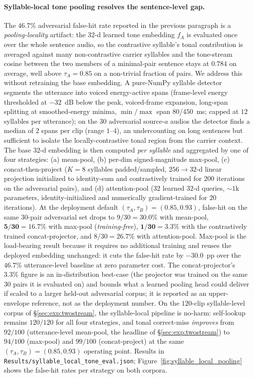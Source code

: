 \documentclass[a4paper,fleqn]{cas-dc}
\begin{document}
\paragraph{Syllable-local tone pooling resolves the sentence-level gap.} The $46.7\%$ adversarial false-hit rate reported in the previous paragraph is a \emph{pooling-locality} artifact: the $32$-d learned tone embedding $f_A$ is evaluated once over the whole sentence audio, so the contrastive syllable's tonal contribution is averaged against many non-contrastive carrier syllables and the tone-stream cosine between the two members of a minimal-pair sentence stays at $0.784$ on average, well above $\tau_A=0.85$ on a non-trivial fraction of pairs. We address this without retraining the base embedding. A pure-NumPy syllable detector segments the utterance into voiced energy-active spans (frame-level energy thresholded at $-32$~dB below the peak, voiced-frame expansion, long-span splitting at smoothed-energy minima, $\min/\max$ span $80$/$450$~ms; capped at $12$ syllables per utterance); on the $30$ adversarial source-$a$ audios the detector finds a median of $2$ spans per clip (range $1$--$4$), an undercounting on long sentences but sufficient to isolate the locally-contrastive tonal region from the carrier context. The base $32$-d embedding is then computed \emph{per syllable} and aggregated by one of four strategies: (a) mean-pool, (b) per-dim signed-magnitude max-pool, (c) concat-then-project ($K{=}8$ syllables padded/sampled, $256\to 32$-d linear projection initialized to identity-sum and contrastively trained for $200$ iterations on the adversarial pairs), and (d) attention-pool ($32$ learned $32$-d queries, $\sim 1$k parameters, identity-initialized and numerically gradient-trained for $20$ iterations). At the deployment default $(\tau_A, \tau_B) = (0.85, 0.93)$, false-hit on the same $30$-pair adversarial set drops to $9/30 = \mathbf{30.0\%}$ with mean-pool, $\mathbf{5/30 = 16.7\%}$ with max-pool (\emph{training-free}), $\mathbf{1/30 = 3.3\%}$ with the contrastively trained concat-projector, and $8/30 = 26.7\%$ with attention-pool. Max-pool is the load-bearing result because it requires no additional training and reuses the deployed embedding unchanged: it cuts the false-hit rate by $\mathbf{-30.0}$~pp over the $46.7\%$ utterance-level baseline at zero parameter cost. The concat-projector's $3.3\%$ figure is an in-distribution best-case (the projector was trained on the same $30$ pairs it is evaluated on) and bounds what a learned pooling head could deliver if scaled to a larger held-out adversarial corpus; it is reported as an upper-envelope reference, not as the deployment number. On the $120$-clip syllable-level corpus of \S\ref{sec:exp:twostream}, the syllable-local pipeline is no-harm: self-lookup remains $120/120$ for all four strategies, and tonal correct-miss \emph{improves} from $92/100$ (utterance-level mean-pool, the headline of \S\ref{sec:exp:twostream}) to $94/100$ (max-pool) and $99/100$ (concat-project) at the same $(\tau_A, \tau_B) = (0.85, 0.93)$ operating point. Results in \texttt{Results/syllable\_local\_tone\_eval.json}; Figure~\ref{fig:syllable_local_pooling} shows the false-hit rates per strategy on both corpora.
\end{document}
